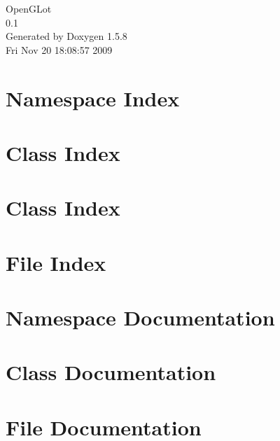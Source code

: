 \documentclass[a4paper]{book}
\begin{document}
\begin{titlepage}
\vspace*{7cm}
\begin{center}
{\Large OpenGLot \\[1ex]\large 0.1 }\\
\vspace*{1cm}
{\large Generated by Doxygen 1.5.8}\\
\vspace*{0.5cm}
{\small Fri Nov 20 18:08:57 2009}\\
\end{center}
\end{titlepage}
\clearemptydoublepage
{}
\tableofcontents
\clearemptydoublepage
{}
\chapter{Namespace Index}

\chapter{Class Index}

\chapter{Class Index}

\chapter{File Index}

\chapter{Namespace Documentation}

\chapter{Class Documentation}











\chapter{File Documentation}











\printindex
\end{document}
